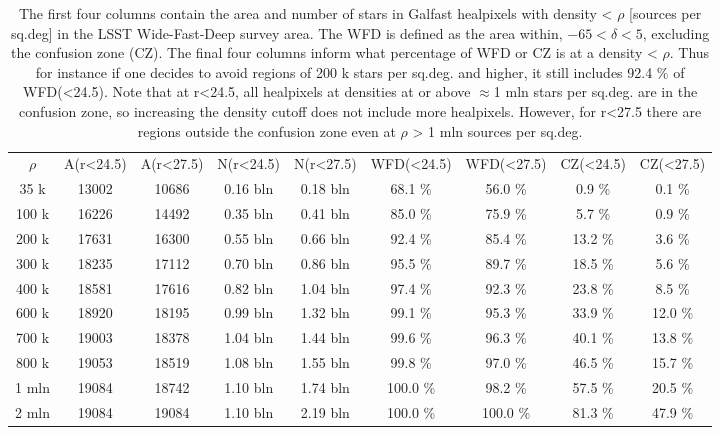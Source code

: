 \documentclass[DM,lsstdraft,toc,usenatbib]{lsstdoc}
\begin{document}
\begin{centering}
\begin{table}
\caption{The first four columns contain the area and number of stars  in Galfast healpixels with density < $\rho$ [sources per sq.deg] in the LSST Wide-Fast-Deep survey area. The WFD is defined as the area within, $-65 < \delta < 5$, excluding the confusion zone (CZ). The final four columns inform what percentage of WFD or CZ is at a density  < $\rho$. Thus for instance if one decides to avoid regions of 200 k stars per sq.deg. and higher, it still includes  92.4 \% of WFD(<24.5). 
Note that at r<24.5, all healpixels at densities at or above $\approx$1 mln stars per sq.deg. are in  the confusion zone, so increasing the density cutoff does not include more healpixels. However, for r<27.5 there are regions outside the confusion zone even at $\rho$ > 1 mln sources per sq.deg. }
\label{tab:galfast_densities}
\begin{tabular}{ccccccccc}
$\rho$ & A(r<24.5) & A(r<27.5) & N(r<24.5) & N(r<27.5) & WFD(<24.5) & WFD(<27.5) & CZ(<24.5) & CZ(<27.5) \\
35 k & 13002 & 10686 & 0.16 bln & 0.18 bln & 68.1 \% & 56.0 \% & 0.9 \% & 0.1 \% \\
100 k & 16226 & 14492 & 0.35 bln & 0.41 bln & 85.0 \% & 75.9 \% & 5.7 \% & 0.9 \% \\
200 k & 17631 & 16300 & 0.55 bln & 0.66 bln & 92.4 \% & 85.4 \% & 13.2 \% & 3.6 \% \\
300 k & 18235 & 17112 & 0.70 bln & 0.86 bln & 95.5 \% & 89.7 \% & 18.5 \% & 5.6 \% \\
400 k & 18581 & 17616 & 0.82 bln & 1.04 bln & 97.4 \% & 92.3 \% & 23.8 \% & 8.5 \% \\
600 k & 18920 & 18195 & 0.99 bln & 1.32 bln & 99.1 \% & 95.3 \% & 33.9 \% & 12.0 \% \\
700 k & 19003 & 18378 & 1.04 bln & 1.44 bln & 99.6 \% & 96.3 \% & 40.1 \% & 13.8 \% \\
800 k & 19053 & 18519 & 1.08 bln & 1.55 bln & 99.8 \% & 97.0 \% & 46.5 \% & 15.7 \% \\
1 mln & 19084 & 18742 & 1.10 bln & 1.74 bln & 100.0 \% & 98.2 \% & 57.5 \% & 20.5 \% \\
2 mln & 19084 & 19084 & 1.10 bln & 2.19 bln & 100.0 \% & 100.0 \% & 81.3 \% & 47.9 \% \\
\end{tabular}
\end{table}
\end{centering}
\end{document}
